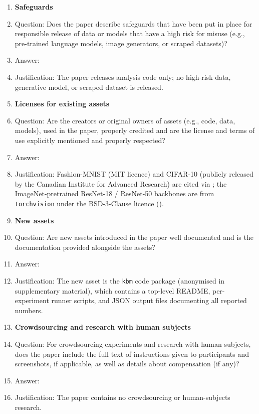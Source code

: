 \begin{enumerate}
\item {\bf Safeguards}
    \item[] Question: Does the paper describe safeguards that have been put in place for responsible release of data or models that have a high risk for misuse (e.g., pre-trained language models, image generators, or scraped datasets)?
    \item[] Answer: \answerNA{}
    \item[] Justification: The paper releases analysis code only; no high-risk data, generative model, or scraped dataset is released.

\item {\bf Licenses for existing assets}
    \item[] Question: Are the creators or original owners of assets (e.g., code, data, models), used in the paper, properly credited and are the license and terms of use explicitly mentioned and properly respected?
    \item[] Answer: \answerYes{}
    \item[] Justification: Fashion-MNIST (MIT licence) and CIFAR-10 (publicly released by the Canadian Institute for Advanced Research) are cited via \citet{xiao2017fashion,krizhevsky2009learning}; the ImageNet-pretrained ResNet-18 / ResNet-50 backbones are from \texttt{torchvision} under the BSD-3-Clause licence (\citealp{he2016deep}).

\item {\bf New assets}
    \item[] Question: Are new assets introduced in the paper well documented and is the documentation provided alongside the assets?
    \item[] Answer: \answerYes{}
    \item[] Justification: The new asset is the \texttt{kbm} code package (anonymised in supplementary material), which contains a top-level README, per-experiment runner scripts, and JSON output files documenting all reported numbers.

\item {\bf Crowdsourcing and research with human subjects}
    \item[] Question: For crowdsourcing experiments and research with human subjects, does the paper include the full text of instructions given to participants and screenshots, if applicable, as well as details about compensation (if any)?
    \item[] Answer: \answerNA{}
    \item[] Justification: The paper contains no crowdsourcing or human-subjects research.


\end{enumerate}
